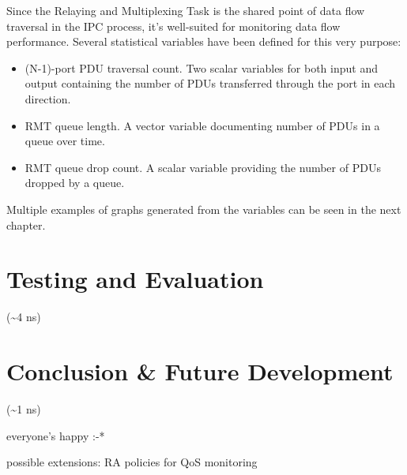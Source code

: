             Since the Relaying and Multiplexing Task is the shared point of data flow traversal in the IPC process, it's well-suited for monitoring data flow performance. Several statistical variables have been defined for this very purpose:

            \begin{itemize}
            \item (N-1)-port PDU traversal count. Two scalar variables for both input and output containing the number of PDUs transferred through the port in each direction.
            \item RMT queue length. A vector variable documenting number of PDUs in a queue over time.
            \item RMT queue drop count. A scalar variable providing the number of PDUs dropped by a queue.
            \end{itemize}

            Multiple examples of graphs generated from the variables can be seen in the next chapter.

    \section{}


\chapter{Testing and Evaluation}
    (\textasciitilde4 ns)

\chapter{Conclusion \& Future Development}
    (\textasciitilde1 ns)

    everyone's happy :-*

    possible extensions: RA policies for QoS monitoring
